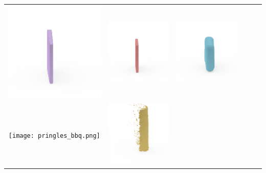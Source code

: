 \documentclass[10pt,onecolumn,letterpaper]{article}
\begin{document}
\begin{tabular}{cccccc}
\includegraphics[height=\turnheight, clip=true, trim=60 30 30 5]{quaker_big_chewy_chocolate_chip_NP1_0_bb_view_0.png} &
\includegraphics[height=\turnheight, clip=true, trim=60 30 30 5]{quaker_big_chewy_chocolate_chip_NP1_0_zheng_view_0.png} &
\includegraphics[height=\turnheight, clip=true, trim=60 30 30 5]{quaker_big_chewy_chocolate_chip_NP1_0_oma_view_0} \\
\texttt{[image: pringles\_bbq.png]} &
\includegraphics[height=\turnheight, clip=true, trim=60 30 30 5]{pringles_bbq_NP1_312_visible_pixels_view_180.png} &

\end{tabular}
\end{document}
